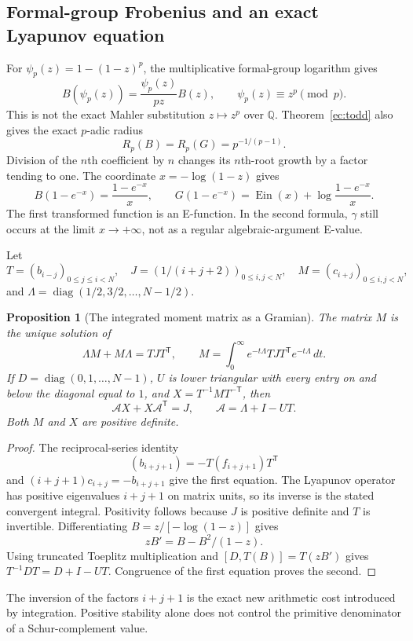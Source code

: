 \documentclass[11pt,a4paper]{article}
\newcommand{\Q}{\mathbb Q}
\newcommand{\Ein}{\operatorname{Ein}}
\newtheorem{proposition}[theorem]{Proposition}
\theoremstyle{definition}
\theoremstyle{remark}
\numberwithin{equation}{section}
\begin{document}
\subsection{Formal-group Frobenius and an exact Lyapunov equation}
\label{ec:lyapunov}
For $\psi_p(z)=1-(1-z)^p$, the multiplicative formal-group logarithm gives
\[
 B(\psi_p(z))=\frac{\psi_p(z)}{pz}B(z),\qquad
 \psi_p(z)\equiv z^p\pmod p.
\]
This is not the exact Mahler substitution $z\mapsto z^p$ over $\Q$.
Theorem~\ref{ec:todd} also gives the exact $p$-adic radius
\[
 R_p(B)=R_p(G)=p^{-1/(p-1)}.
\]
Division of the $n$th coefficient by $n$ changes its $n$th-root growth
by a factor tending to one.  The coordinate $x=-\log(1-z)$ gives
\[
 B(1-e^{-x})=\frac{1-e^{-x}}x,\qquad
 G(1-e^{-x})=\Ein(x)+\log\frac{1-e^{-x}}x.
\]
The first transformed function is an E-function.  In the second formula,
$\gamma$ still occurs at the limit $x\to+\infty$, not as a regular
algebraic-argument E-value.

Let
\[
 T=(b_{i-j})_{0\le j\le i<N},\quad
 J=(1/(i+j+2))_{0\le i,j<N},\quad
 M=(c_{i+j})_{0\le i,j<N},
\]
and $\Lambda=\operatorname{diag}(1/2,3/2,\ldots,N-1/2)$.

\begin{proposition}[The integrated moment matrix as a Gramian]
\label{ec:lyapunov-theorem}
The matrix $M$ is the unique solution of
\[
 \Lambda M+M\Lambda=TJT^{\mathsf T},
 \qquad
 M=\int_0^\infty e^{-t\Lambda}TJT^{\mathsf T}e^{-t\Lambda}\,dt.
\]
If $D=\operatorname{diag}(0,1,\ldots,N-1)$, $U$ is lower triangular
with every entry on and below the diagonal equal to $1$, and
$X=T^{-1}MT^{-\mathsf T}$, then
\[
 \mathcal A X+X\mathcal A^{\mathsf T}=J,
 \qquad \mathcal A=\Lambda+I-UT.
\]
Both $M$ and $X$ are positive definite.
\end{proposition}
\begin{proof}
The reciprocal-series identity
\[
 (b_{i+j+1})=-T(f_{i+j+1})T^{\mathsf T}
\]
and $(i+j+1)c_{i+j}=-b_{i+j+1}$ give the first equation.
The Lyapunov operator has positive eigenvalues $i+j+1$ on matrix units,
so its inverse is the stated convergent integral.  Positivity follows
because $J$ is positive definite and $T$ is invertible.
Differentiating $B=z/[-\log(1-z)]$ gives
\[
 zB'=B-B^2/(1-z).
\]
Using truncated Toeplitz multiplication and
$[D,T(B)]=T(zB')$ gives
$T^{-1}DT=D+I-UT$.  Congruence of the first equation proves the second.
\end{proof}
The inversion of the factors $i+j+1$ is the exact new arithmetic cost
introduced by integration.  Positive stability alone does not control
the primitive denominator of a Schur-complement value.
\end{document}
